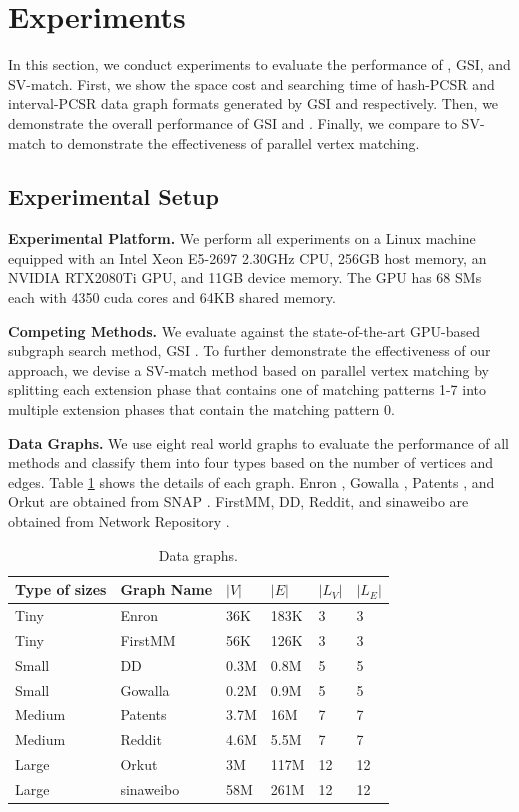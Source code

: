 \section{Experiments}
In this section, we conduct experiments to evaluate the performance of \SystemName, GSI, and SV-match. First, we show the space cost and searching time of hash-PCSR and interval-PCSR data graph formats generated by GSI and \SystemName respectively. Then, we demonstrate the overall performance of GSI and \SystemName. Finally, we compare \SystemName to SV-match to demonstrate the effectiveness of parallel vertex matching.
\subsection{Experimental Setup}
\textbf{Experimental Platform.} We perform all experiments on a Linux machine equipped with an Intel Xeon E5-2697 2.30GHz CPU, 256GB host memory, an NVIDIA RTX2080Ti GPU, and 11GB device memory. The GPU has 68 SMs each with 4350 cuda cores and 64KB shared memory.

\textbf{Competing Methods.} We evaluate \SystemName against the state-of-the-art GPU-based subgraph search method, GSI \cite{zeng2020gsi}. To further demonstrate the effectiveness of our approach, we devise a SV-match method based on parallel vertex matching by splitting each extension phase that contains one of matching patterns 1-7 into multiple extension phases that contain the matching pattern 0.

\textbf{Data Graphs.} We use eight real world graphs to evaluate the performance of all methods and classify them into four types based on the number of vertices and edges. Table \ref{tab:datagraph} shows the details of each graph. Enron \cite{leskovec2009community}, Gowalla \cite{cho2011friendship}, Patents \cite{leskovec2005graphs}, and Orkut \cite{yang2015defining} are obtained from SNAP \cite{snapnets}. FirstMM, DD, Reddit, and sinaweibo are obtained from Network Repository \cite{ryan2015network,nr-sigkdd16}.

\begin{table}
\centering
  \caption{Data graphs.}
  \label{tab:datagraph}
  \small
  \begin{tabular}{llllll}
  \toprule
    \textbf{Type of sizes}&\textbf{Graph Name} &$|V|$&$|E|$&$|L_V|$&$|L_E|$\\
    \midrule
    Tiny	&Enron		&36K	&183K	&3	&3 \\
    Tiny	&FirstMM 	&56K	&126K	&3	&3 \\
    Small	&DD			&0.3M	&0.8M	&5	&5\\
    Small	&Gowalla	&0.2M	&0.9M	&5	&5\\
    Medium	&Patents	&3.7M	&16M	&7	&7\\
    Medium	&Reddit		&4.6M	&5.5M	&7	&7\\
    Large	&Orkut		&3M		&117M	&12	&12\\
	Large	&sinaweibo	&58M	&261M	&12	&12\\

    \bottomrule
  \end{tabular}
\end{table}

